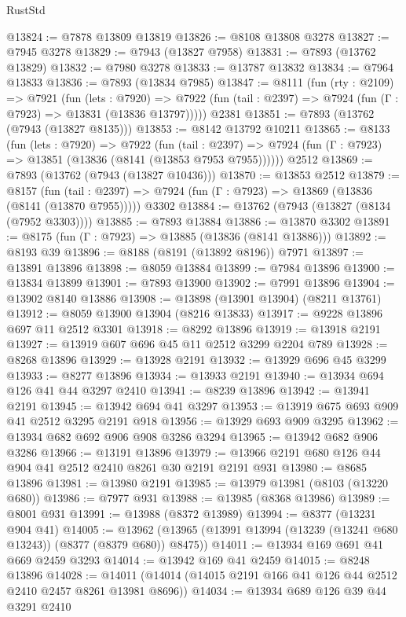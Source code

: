 \begin{lexlean}{RustStd}
\begin{coremodule}
{\begin{coremodule}
{{{{{{{{{{{{{{{{{{{{{{{{{{{{{{{{{{{{{{{{{{{{{{{{{{@13824 := @7878 @13809 @13819
@13826 := @8108 @13808 @3278
@13827 := @7945 @3278
@13829 := @7943 (@13827 @7958)
@13831 := @7893 (@13762 @13829)
@13832 := @7980 @3278
@13833 := @13787 @13832
@13834 := @7964 @13833
@13836 := @7893 (@13834 @7985)
@13847 := @8111
    (fun (rty : @2109) =>
    @7921
      (fun (lets : @7920) =>
      @7922 (fun (tail : @2397) => @7924 (fun (Γ : @7923) => @13831 (@13836 @13797)))))
    @2381
@13851 := @7893 (@13762 (@7943 (@13827 @8135)))
@13853 := @8142 @13792 @10211
@13865 := @8133
    (fun (lets : @7920) =>
    @7922
      (fun (tail : @2397) =>
      @7924 (fun (Γ : @7923) => @13851 (@13836 (@8141 (@13853 @7953 @7955))))))
    @2512
@13869 := @7893 (@13762 (@7943 (@13827 @10436)))
@13870 := @13853 @2512
@13879 := @8157
    (fun (tail : @2397) => @7924 (fun (Γ : @7923) => @13869 (@13836 (@8141 (@13870 @7955)))))
    @3302
@13884 := @13762 (@7943 (@13827 (@8134 (@7952 @3303))))
@13885 := @7893 @13884
@13886 := @13870 @3302
@13891 := @8175 (fun (Γ : @7923) => @13885 (@13836 (@8141 @13886)))
@13892 := @8193 @39
@13896 := @8188 (@8191 (@13892 @8196)) @7971
@13897 := @13891 @13896
@13898 := @8059 @13884
@13899 := @7984 @13896
@13900 := @13834 @13899
@13901 := @7893 @13900
@13902 := @7991 @13896
@13904 := @13902 @8140 @13886
@13908 := @13898 (@13901 @13904) (@8211 @13761)
@13912 := @8059 @13900 @13904 (@8216 @13833)
@13917 := @9228 @13896 @697 @11 @2512 @3301
@13918 := @8292 @13896
@13919 := @13918 @2191
@13927 := @13919 @607 @696 @45 @11 @2512 @3299 @2204 @789
@13928 := @8268 @13896
@13929 := @13928 @2191
@13932 := @13929 @696 @45 @3299
@13933 := @8277 @13896
@13934 := @13933 @2191
@13940 := @13934 @694 @126 @41 @44 @3297 @2410
@13941 := @8239 @13896
@13942 := @13941 @2191
@13945 := @13942 @694 @41 @3297
@13953 := @13919 @675 @693 @909 @41 @2512 @3295 @2191 @918
@13956 := @13929 @693 @909 @3295
@13962 := @13934 @682 @692 @906 @908 @3286 @3294
@13965 := @13942 @682 @906 @3286
@13966 := @13191 @13896
@13979 := @13966 @2191 @680 @126 @44 @904 @41 @2512 @2410 @8261 @30 @2191 @2191 @931
@13980 := @8685 @13896
@13981 := @13980 @2191
@13985 := @13979 @13981 (@8103 (@13220 @680))
@13986 := @7977 @931
@13988 := @13985 (@8368 @13986)
@13989 := @8001 @931
@13991 := @13988 (@8372 @13989)
@13994 := @8377 (@13231 @904 @41)
@14005 := @13962 (@13965 (@13991 @13994 (@13239 (@13241 @680 @13243)) (@8377 (@8379 @680)) @8475))
@14011 := @13934 @169 @691 @41 @669 @2459 @3293
@14014 := @13942 @169 @41 @2459
@14015 := @8248 @13896
@14028 := @14011 (@14014 (@14015 @2191 @166 @41 @126 @44 @2512 @2410 @2457 @8261 @13981 @8696))
@14034 := @13934 @689 @126 @39 @44 @3291 @2410
}}}}}}}}}}}}}}}}}}}}}}}}}}}}}}}}}}}}}}}}}}}}}}}}}}
\end{coremodule}}
\end{coremodule}
\end{lexlean}

